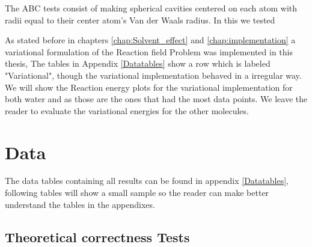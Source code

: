 \documentclass[../master_thesis.tex]{subfiles}
\begin{document}
The \ac{ABC} tests consist of making spherical cavities centered on
each atom with radii equal to their center atom's Van der Waals radius. In this we tested

As stated before in chapters \ref{chap:Solvent_effect} and \ref{chap:implementation}
a variational formulation of the Reaction field Problem was implemented in this thesis,
The tables in Appendix \ref{Datatables} show a row which is labeled "Variational",
though the variational implementation behaved in a irregular way. We will show
the Reaction energy plots for the variational implementation for both water
and  as those are the ones that had the most data points. We leave the
reader to evaluate the variational energies for the other molecules.


\section{Data}
The data tables containing all results can be found in appendix \ref{Datatables}, following
tables will show a small sample so the reader can make better understand the tables
in the appendixes.
\subsection{Theoretical correctness Tests}
\end{document}
